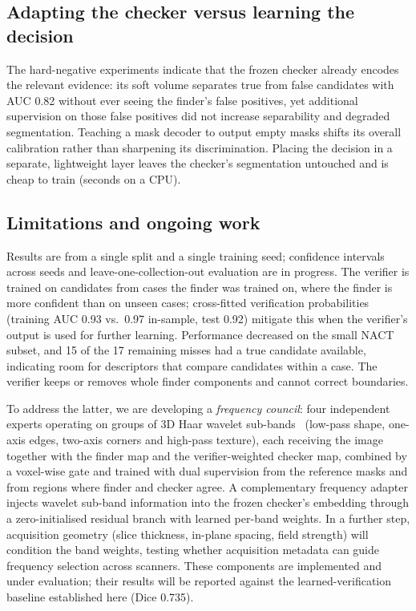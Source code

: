 \documentclass[journal]{IEEEtran}
\begin{document}
\subsection{Adapting the checker versus learning the decision}
The hard-negative experiments indicate that the frozen checker already encodes the relevant evidence: its soft volume separates true from false candidates with AUC 0.82 without ever seeing the finder's false positives, yet additional supervision on those false positives did not increase separability and degraded segmentation. Teaching a mask decoder to output empty masks shifts its overall calibration rather than sharpening its discrimination. Placing the decision in a separate, lightweight layer leaves the checker's segmentation untouched and is cheap to train (seconds on a CPU).

\subsection{Limitations and ongoing work}
Results are from a single split and a single training seed; confidence intervals across seeds and leave-one-collection-out evaluation are in progress. The verifier is trained on candidates from cases the finder was trained on, where the finder is more confident than on unseen cases; cross-fitted verification probabilities (training AUC 0.93 vs.\ 0.97 in-sample, test 0.92) mitigate this when the verifier's output is used for further learning. Performance decreased on the small NACT subset, and 15 of the 17 remaining misses had a true candidate available, indicating room for descriptors that compare candidates within a case. The verifier keeps or removes whole finder components and cannot correct boundaries.

To address the latter, we are developing a \emph{frequency council}: four independent experts operating on groups of 3D Haar wavelet sub-bands~\cite{mallat1989wavelet} (low-pass shape, one-axis edges, two-axis corners and high-pass texture), each receiving the image together with the finder map and the verifier-weighted checker map, combined by a voxel-wise gate and trained with dual supervision from the reference masks and from regions where finder and checker agree. A complementary frequency adapter injects wavelet sub-band information into the frozen checker's embedding through a zero-initialised residual branch with learned per-band weights. In a further step, acquisition geometry (slice thickness, in-plane spacing, field strength) will condition the band weights, testing whether acquisition metadata can guide frequency selection across scanners. These components are implemented and under evaluation; their results will be reported against the learned-verification baseline established here (Dice 0.735).
\end{document}
